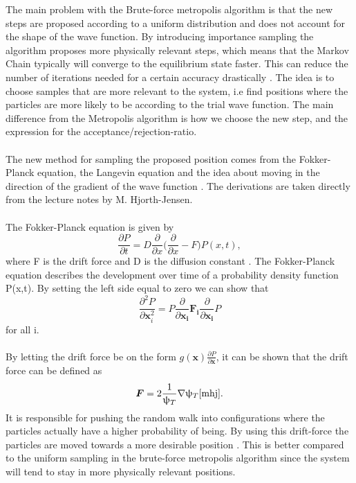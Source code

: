 The main problem with the Brute-force metropolis algorithm is that the new steps are proposed according to a uniform distribution and does not account for the shape of the wave function. 
By introducing importance sampling the algorithm proposes more physically relevant steps, which means that the Markov Chain typically will converge to the equilibrium state faster. This can reduce the number of iterations needed for a certain accuracy drastically \cite{compstat}.  The idea is to choose samples that are more relevant to the system, i.e find positions where the particles are more likely to be according to the trial wave function. The main difference from the Metropolis algorithm is how we choose the new step, and the expression for the acceptance/rejection-ratio. 
\\
\\
The new method for sampling the proposed position comes from the Fokker-Planck equation, the Langevin equation and the idea about moving in the direction of the gradient of the wave function \cite{mhj}. The derivations are taken directly from the lecture notes by M. Hjorth-Jensen\cite{mhj}. 
\\
\\
The Fokker-Planck equation is given by
\begin{equation}
    \frac{\partial P}{\partial t} = D\frac{\partial}{\partial x}\bigg( \frac{\partial}{\partial x } -F \bigg)P(x,t),
\end{equation}
where F is the drift force and D is the diffusion constant \cite{mhj}.
The Fokker-Planck equation describes the development over time of a probability density function P(x,t). By setting the left side equal to zero we can show that 
\begin{equation}
    \frac{\partial^2 P}{\partial\boldsymbol{x}_i^2} = P\frac{\partial}{\partial \boldsymbol{x_i}}\boldsymbol{F_i}\frac{\partial }{\partial \boldsymbol{x_i}}P
\end{equation}
for all i\cite{mhj}. 
\\
\\
By letting the drift force be on the form $g(\boldsymbol{x})\frac{\partial P}{\partial \boldsymbol{x}}$, it can be shown that the drift force can be defined as 
\begin{equation}
    \boldsymbol{F} = 2\frac{1}{\uppsi_T}\nabla \uppsi_T \cite{mhj}.
\end{equation}
It is responsible for pushing the random walk into configurations where the particles actually have a higher probability of being. By using this drift-force the particles are moved towards a more desirable position \cite{mhj}. This is better compared to the uniform sampling in the brute-force metropolis algorithm since the system will tend to stay in more physically relevant positions. 
